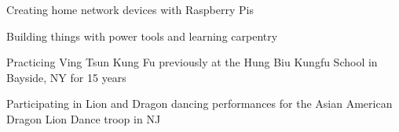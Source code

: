 


\begin{cventries}


\cventry
{} %
{}
{}
{}
{%
\begin{cvitems}
\item {Creating home network devices with Raspberry Pis}
\item {Building things with power tools and learning carpentry}
\item {Practicing Ving Tsun Kung Fu previously at the Hung Biu Kungfu School in Bayside, NY for 15 years}
\item {Participating in Lion and Dragon dancing performances for the Asian American Dragon Lion Dance troop in NJ}
\end{cvitems}
}


\end{cventries}
